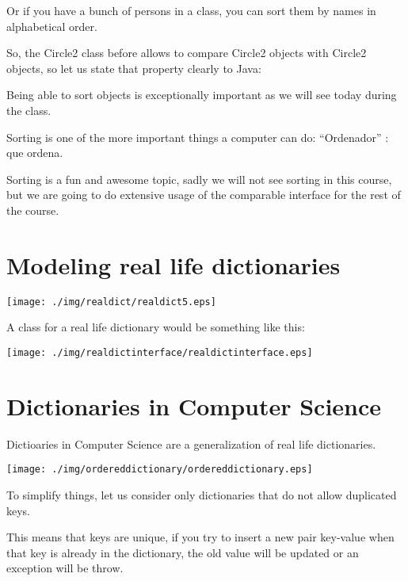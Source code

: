 \documentclass[a4paper, 9pt]{extarticle}
\begin{document}
Or if you have a bunch of persons in a class, you can sort them by names in alphabetical order.

So, the Circle2 class before allows to compare Circle2 objects with Circle2
objects, so let us state that property clearly to Java:


Being able to sort objects is exceptionally important as we will see today during the class.

Sorting is one of the more important things a computer can do: ``Ordenador'' : que ordena.

Sorting is a fun and awesome topic, sadly we will not see sorting in this course, but
we are going to do extensive usage of the comparable interface for the rest of
the course.

\newpage

\section{Modeling real life dictionaries}

\begin{center}
  \texttt{[image: ./img/realdict/realdict5.eps]}
\end{center}

A class for a real life dictionary would be something like this:

\begin{center}
  \texttt{[image: ./img/realdictinterface/realdictinterface.eps]}
\end{center}


\newpage





\section{Dictionaries in Computer Science}

Dictioaries in Computer Science are a generalization of real life dictionaries.

\begin{center}
  \texttt{[image: ./img/ordereddictionary/ordereddictionary.eps]}
\end{center}

To simplify things, let us consider only dictionaries that do not allow duplicated keys.

This means that keys are unique, if you try to insert a new pair key-value when
that key is already in the dictionary, the old value will be updated or an
exception will be throw.
\end{document}

